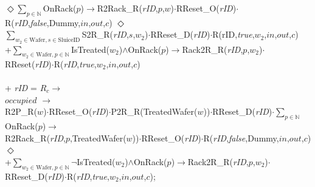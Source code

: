 \documentclass[12pt]{report}
\begin{document}
{	\phantom{--------------} $\Diamond \sum\nolimits_{p\in \mathbb{N}}$OnRack($p$)$\rightarrow$R2Rack\_R(\emph{rID},$p$,$w$)$\cdot$RReset\_O(\emph{rID})$\cdot$R(\emph{rID},\emph{false},Dummy,$in$,$out$,$c$)
	\phantom{----------}  $\Diamond$\\
	\phantom{--------------} $\sum\nolimits_{w_2 \in \text{Wafer}, s \in \text{SluiceID}}$S2R\_R(\emph{rID},$s$,$w_2$)$\cdot$RReset\_D(\emph{rID})$\cdot$R(rID,\emph{true},$w_2$,$in$,$out$,$c$)\\
	\phantom{--------------} +$\sum\nolimits_{w_2 \in \text{Wafer}, p \in \mathbb{N}}$IsTreated($w_2$)$\land$OnRack($p$)$\rightarrow$Rack2R\_R(\emph{rID},$p$,$w_2$)$\cdot$\\
	\phantom{-----------------------------} RReset(\emph{rID})$\cdot$R(\emph{rID},\emph{true},$w_2$,$in$,$out$,$c$)\\
	\\
	\phantom{-------} + \emph{rID} = $R_c \rightarrow$\\
	\phantom{----------} $occupied$ $\rightarrow$\\
	\phantom{--------------} R2P\_R($w$)$\cdot$RReset\_O(\emph{rID})$\cdot$P2R\_R(TreatedWafer($w$))$\cdot$RReset\_D(\emph{rID})$\cdot\sum\nolimits_{p \in \mathbb{N}}$OnRack($p$)$\rightarrow$\\
	\phantom{------------------} R2Rack\_R(\emph{rID},$p$,TreatedWafer($w$))$\cdot$RReset\_O(\emph{rID})$\cdot$R(\emph{rID},\emph{false},Dummy,$in$,$out$,$c$)\\
	\phantom{----------} $\Diamond$\\
	\phantom{--------------} +$\sum\nolimits_{w_2 \in \text{Wafer}, p \in \mathbb{N}}\neg$IsTreated($w_2$)$\land$OnRack($p$)$\rightarrow$Rack2R\_R(\emph{rID},$p$,$w_2$)$\cdot$\\
	\phantom{-----------------------------} RReset\_D(\emph{rID})$\cdot$R(\emph{rID},\emph{true},$w_2$,$in$,$out$,$c$);
	}\\
	\\
\end{document}
